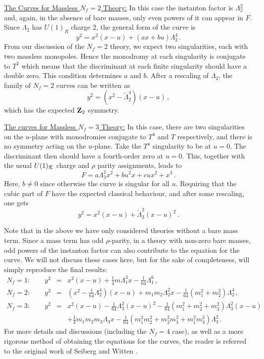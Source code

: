 \noindent\underline{The Curves for Massless $N_f=2$ Theory:}
In this case the instanton factor is $\Lambda^{2}_{2}$ and, again, in
the absence of bare masses, only even powers of it can appear in $F$. 
Since $\Lambda_2$ has $U(1)_R$ charge 2, the general form of the curve
is
$$
y^2 = x^2 (x-u) + (ax + bu) \Lambda^{4}_{2}\,.
$$
From our discussion of the $N_f=2$ theory, we expect two singularities,
each with two massless monopoles.  Hence the monodromy at each
singularity is conjugate to $T^2$ which means that the discriminant at
each finite singularity should have a double zero.  This condition
determines $a$ and $b$.  After a rescaling of $\Lambda_2$, the
family of $N_f=2$ curves can be written as
$$
y^2 = (x^2 - \tilde{\Lambda}^{4}_{2} ) (x-u)\,,
$$
which has the expected ${\bf Z}_2$ symmetry.

\noindent\underline{The curves for Massless $N_f=3$ Theory:} In this
case, there are two singularities on the $u$-plane with monodromies
conjugate to $T^4$ and $T$ respectively, and there is no symmetry
acting on the $u$-plane. Take the $T^4$ singularity to be at $u =
0$. The discriminant then should have a fourth-order zero at
$u=0$. This, together with the usual $U(1)_{\cal R}$ charge and $\rho$
parity assignments, leads to
$$
F = a \Lambda^{2}_{3} x^2 + bu^2 x + cu x^2 + x^3 \,.
$$
Here, $b \not= 0$ since otherwise the curve is singular for all $u$.
Requiring that the cubic part of $F$ have the expected classical
behaviour, and after some rescaling, one gets
$$
y^2 = x^2 (x-u) + \tilde {\Lambda}^{2}_{3} (x-u)^2\,.
$$

Note that in the above we have only considered theories without a bare
mass term. Since a mass term has odd $\rho$-parity, in a theory with
non-zero bare masses, odd powers of the instanton factor can also
contribute to the equation for the curve. We will not discuss these
cases here, but for the sake of completeness, will simply reproduce
the final results:
\begin{eqnarray}
N_f=1:\qquad y^2 &=& x^2(x-u)+ \frac{1}{4}m\Lambda_1^3 x -
\frac{1}{64} \Lambda_1^6\,, \nonumber \\
N_f=2:\qquad y^2 &=& (x^2-\frac{1}{64}\Lambda_2^4) (x-u) + m_1 m_2
\Lambda_2^2 x - \frac{1}{64}(m_1^2+m_2^2)\Lambda_2^4\,,\nonumber \\
N_f=3:\qquad y^2 &=& x^2(x-u)-\frac{1}{64} \Lambda_3^2(x-u)^2
-\frac{1}{64}(m_1^2+m_2^2+m_3^2) \Lambda_3^2(x-u) \nonumber \\
      && +\frac{1}{4}m_1m_2m_3 \Lambda_3 x - \frac{1}{64}
(m_1^2 m_2^2 + m_2^2 m_3^2 + m_1^2 m_3^2)\Lambda_3^2\,. \nonumber
\end{eqnarray}
For more details and discussions (including the $N_f=4$ case), as well
as a more rigorous method of obtaining the equations for the curves,
the reader is referred to the original work of Seiberg and Witten
\cite{SW2}.   

